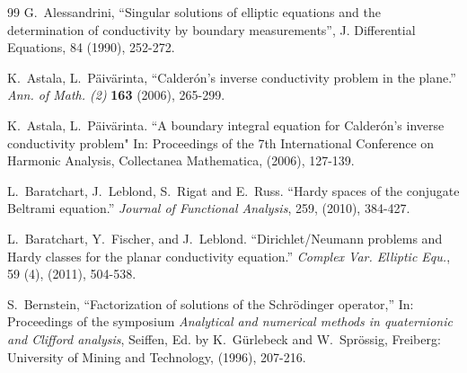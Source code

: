 \documentclass[12pt]{article}
\def\div{\mbox{div}\,}
\begin{document}




\begin{thebibliography}{99}
G.~Alessandrini, ``Singular solutions of elliptic equations and the determination of conductivity by boundary measurements'', J. Differential Equations, 84 (1990), 252-272.

 K.~Astala, L.~P\"{a}iv\"{a}rinta, ``Calder\'{o}n's  inverse conductivity problem in the plane.''  {\em Ann. of Math. (2)} \textbf{163} (2006), 265-299.

K.~Astala, L.~P\"{a}iv\"{a}rinta. ``A boundary integral equation for Calderón’s inverse
conductivity problem" In: Proceedings of the 7th International Conference on
Harmonic Analysis, Collectanea Mathematica, (2006), 127-139.




L.~Baratchart, J.~Leblond, S.~Rigat and E.~Russ. ``Hardy spaces of the conjugate Beltrami equation.''
{\em Journal of Functional Analysis}, 259, (2010), 384-427.

L.~Baratchart, Y.~Fischer, and J.~Leblond. ``Dirichlet/Neumann problems and Hardy classes for the planar conductivity equation.''
{\em Complex Var. Elliptic Equ.}, 59 (4), (2011), 504-538.

S.~Bernstein, ``Factorization of solutions of the Schr\"{odinger operator},'' In: Proceedings of the symposium
{\em Analytical and numerical methods in quaternionic and Clifford analysis}, Seiffen, Ed. by K.~G\"{u}rlebeck and W.~Spr\"{o}ssig, Freiberg: University of Mining and Technology, (1996), 207-216.


\end{thebibliography}
\end{document}
